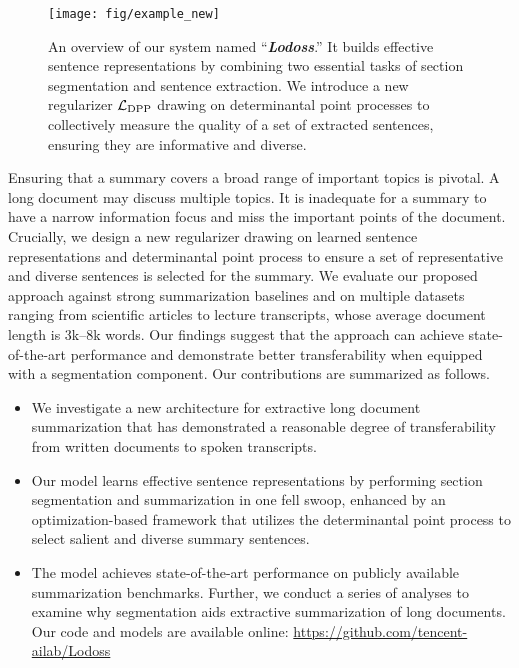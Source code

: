 \documentclass[11pt]{article}
\begin{document}
\begin{figure*}
\centering
\texttt{[image: fig/example\_new]}
\vspace{-0.05in}
\caption{An overview of our system named ``\textbf{\textsl{Lodoss}}.'' It builds effective sentence representations by combining two essential tasks of section segmentation and sentence extraction. We introduce a new regularizer $\mathcal{L}_{\scriptsize\mbox{DPP}}$ drawing on determinantal point processes to collectively measure the quality of a set of extracted sentences, ensuring they are informative and diverse. 
}
\label{fig:network}
\end{figure*}


Ensuring that a summary covers a broad range of important topics is pivotal.
A long document may discuss multiple topics. 
It is inadequate for a summary to have a narrow information focus and miss the important points of the document.
Crucially, we design a new regularizer drawing on learned sentence representations and determinantal point process \cite{Kulesza:2012,cho-etal-2019-improving}
to ensure a set of representative and diverse sentences
is selected for the summary.
We evaluate our proposed approach against strong summarization baselines 
and on multiple datasets ranging from scientific articles to lecture transcripts,
whose average document length is 3k--8k words.
Our findings suggest that the approach can achieve state-of-the-art performance
and demonstrate better transferability when equipped with a segmentation component.
Our contributions are summarized as follows.
\begin{itemize}[topsep=10pt,itemsep=0pt,leftmargin=*]
\item We investigate a new architecture for extractive long document summarization
that has demonstrated a reasonable degree of transferability from written documents to spoken transcripts.

\item Our model learns effective sentence representations by performing section segmentation and summarization in one fell swoop, enhanced by an optimization-based framework that utilizes the determinantal point process to select salient and diverse summary sentences. 

\item The model achieves state-of-the-art performance on publicly available summarization benchmarks.
Further, we conduct a series of analyses to examine why segmentation aids extractive summarization 
of long documents.
Our code and models are available online: \url{https://github.com/tencent-ailab/Lodoss}
\end{itemize}
\end{document}
